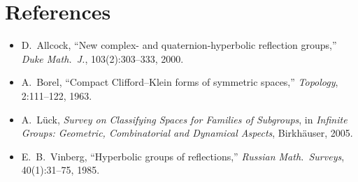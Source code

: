 \documentclass[12pt]{article}
\theoremstyle{definition}
\theoremstyle{remark}
\begin{document}
\section*{References}

\begin{itemize}
\item D.~Allcock, ``New complex- and quaternion-hyperbolic reflection groups,''
  \emph{Duke Math.\ J.}, 103(2):303--333, 2000.
\item A.~Borel, ``Compact Clifford--Klein forms of symmetric spaces,''
  \emph{Topology}, 2:111--122, 1963.
\item A.~L\"uck, \emph{Survey on Classifying Spaces for Families of Subgroups},
  in \emph{Infinite Groups: Geometric, Combinatorial and Dynamical Aspects},
  Birkh\"auser, 2005.
\item E.~B.~Vinberg, ``Hyperbolic groups of reflections,''
  \emph{Russian Math.\ Surveys}, 40(1):31--75, 1985.
\end{itemize}
\end{document}
